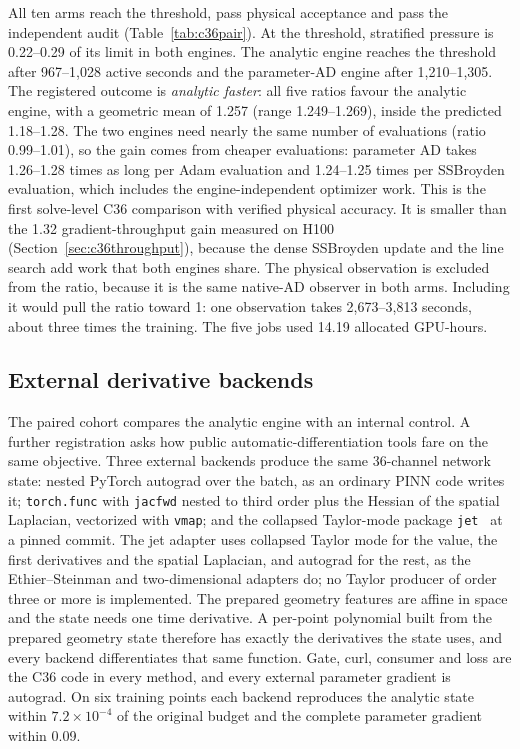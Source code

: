 \documentclass[11pt]{article}
\begin{document}
All ten arms reach the threshold, pass physical acceptance and pass the
independent audit (Table~\ref{tab:c36pair}). At the threshold, stratified
pressure is 0.22--0.29 of its limit in both engines. The analytic engine
reaches the threshold after 967--1,028 active seconds and the parameter-AD
engine after 1,210--1,305. The registered outcome is \emph{analytic
faster}: all five ratios favour the analytic engine, with a geometric mean
of 1.257 (range 1.249--1.269), inside the predicted 1.18--1.28. The two
engines need nearly the same number of evaluations (ratio 0.99--1.01), so
the gain comes from cheaper evaluations: parameter AD takes 1.26--1.28
times as long per Adam evaluation and 1.24--1.25 times per SSBroyden
evaluation, which includes the engine-independent optimizer work. This is
the first solve-level C36 comparison with verified physical accuracy. It
is smaller than the 1.32 gradient-throughput gain measured on H100
(Section~\ref{sec:c36throughput}), because the
dense SSBroyden update and the line search add work that both engines
share. The physical observation is excluded from the ratio, because it is
the same native-AD observer in both arms. Including it would pull the
ratio toward 1: one observation takes 2,673--3,813 seconds, about three
times the training. The five jobs used 14.19 allocated GPU-hours.

\subsection{External derivative backends}\label{sec:c36external}
The paired cohort compares the analytic engine with an internal control. A
further registration asks how public automatic-differentiation tools fare on
the same objective. Three external backends produce the same 36-channel
network state: nested PyTorch autograd over the batch, as an ordinary PINN
code writes it; \texttt{torch.func} with \texttt{jacfwd} nested to third
order plus the Hessian of the spatial Laplacian, vectorized with
\texttt{vmap}; and the collapsed Taylor-mode package \texttt{jet}~\cite{cmtad}
at a pinned commit. The jet adapter uses collapsed Taylor mode for the value,
the first derivatives and the spatial Laplacian, and autograd for the rest,
as the Ethier--Steinman and two-dimensional adapters do; no Taylor producer of
order three or more is implemented. The prepared geometry features are affine
in space and the state needs one time derivative. A per-point polynomial built
from the prepared geometry state therefore has exactly the derivatives the
state uses, and every backend differentiates that same function. Gate, curl,
consumer and loss are the C36 code in every method, and every external
parameter gradient is autograd. On six training points each backend
reproduces the analytic state within $7.2\times10^{-4}$ of the original budget
and the complete parameter gradient within 0.09.
\end{document}
